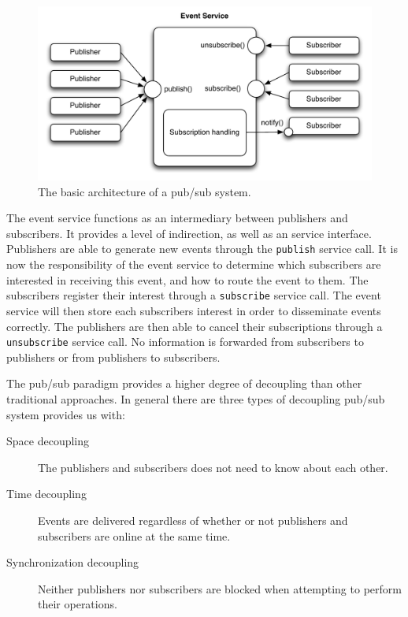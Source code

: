 \begin{figure}
\centering
\includegraphics[width=\textwidth]{figures/pubsubarch}
\caption{The basic architecture of a pub/sub system.}
\label{fig:pubsubarch}
\end{figure}

The event service functions as an intermediary between publishers and
subscribers. It provides a level of indirection, as well as an service
interface. Publishers are able to generate new events through the
\texttt{publish} service call. It is now the responsibility of the event
service to determine which subscribers are interested in receiving this
event, and how to route the event to them. The subscribers register
their interest through a \texttt{subscribe} service call. The event
service will then store each subscribers interest in order to
disseminate events correctly. The publishers are then able to cancel
their subscriptions through a \texttt{unsubscribe} service call. No
information is forwarded from subscribers to publishers or from
publishers to subscribers.

The pub/sub paradigm provides a higher degree of decoupling than other
traditional approaches. In general there are three types of decoupling
pub/sub system provides us with:

\begin{description}
  \item[Space decoupling] The publishers and subscribers does not need to
    know about each other.
  \item[Time decoupling] Events are delivered regardless of whether or
    not publishers and subscribers are online at the same time.
  \item[Synchronization decoupling] Neither publishers nor subscribers
    are blocked when attempting to perform their operations.
\end{description}

